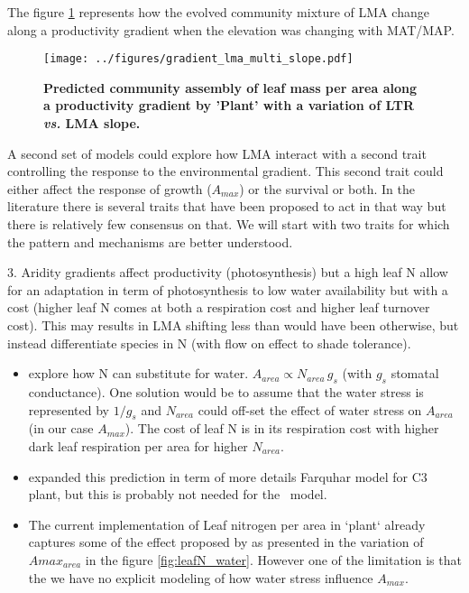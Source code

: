 \documentclass[a4paper,11pt]{article}
\begin{document}
The figure \ref{fig:lma_mat_o_map} represents how the evolved community mixture of LMA change along a productivity gradient when the elevation was changing with MAT/MAP.

\begin{figure}[ht]
\centering
\texttt{[image: ../figures/gradient\_lma\_multi\_slope.pdf]}
\caption{\textbf{Predicted community assembly of leaf mass per area along a productivity gradient by 'Plant' with a variation of LTR \textit{vs.} LMA slope.}
\label{fig:lma_mat_o_map}}
\end{figure}


\clearpage

A second set of models could explore how LMA interact with a second trait controlling the response to the environmental gradient. This second trait could either affect the response of growth ($A_{max}$) or the survival or both. In the literature there is several traits that have been proposed to act in that way but there is relatively few consensus on that. We will start with two traits for which the pattern and mechanisms are better understood.

3. Aridity gradients affect productivity (photosynthesis) but a
high leaf N allow for an adaptation in term of photosynthesis to low water availability but with a cost (higher leaf N comes at both a respiration cost and higher leaf turnover cost). This may results in LMA shifting less than would have been otherwise, but  instead differentiate species in N (with flow on effect to shade tolerance).


\begin{itemize}
\item \citet{Wright-2003} explore how N can substitute for water. $A_{area} \propto N_{area} \, g_s$ (with $g_s$ stomatal conductance). One solution would be to assume that the water stress is represented by $1/g_s$ and $N_{area}$ could off-set the effect of water stress on $A_{area}$ (in our case $A_{max}$). The cost of leaf N is in its respiration cost with higher dark leaf respiration per area for higher $N_{area}$.

\item \citet{Prentice-2014} expanded this prediction in term of more details Farquhar model for C3 plant, but this is probably not needed for the \plant\ model.
 
\item The current implementation of Leaf nitrogen per area in `plant` already captures some of the effect proposed by \citet{Wright-2003} as presented in the variation of $A{max}_{area}$ in the figure \ref{fig:leafN_water}. However one of the limitation is that the we have no explicit modeling of how water stress influence $A_{max}$. 
\end{itemize}
\end{document}
